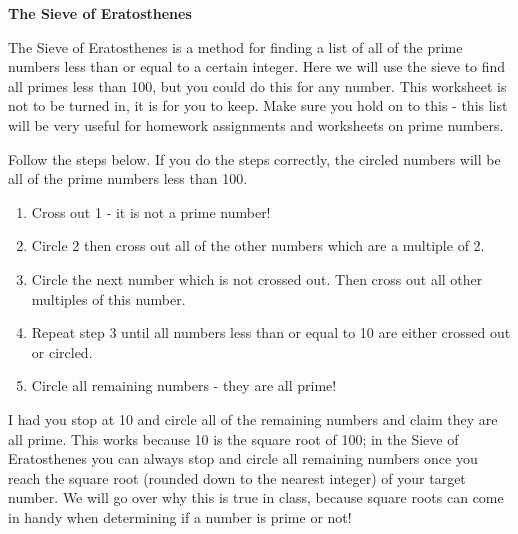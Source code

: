 \documentclass{article}
\begin{document}
\pagestyle{empty}

\begin{center}
\large{\textbf{The Sieve of Eratosthenes}}
\end{center}

\noindent The Sieve of Eratosthenes is a method for finding a list of all of the prime numbers less than or equal to a certain integer. Here we will use the sieve to find all primes less than 100, but you could do this for any number. This worksheet is not to be turned in, it is for you to keep. Make sure you hold on to this - this list will be very useful for homework assignments and worksheets on prime numbers.

\vspace{0.2in}

\noindent Follow the steps below. If you do the steps correctly, the circled numbers will be all of the prime numbers less than 100.
\begin{enumerate}
\item Cross out 1 - it is not a prime number!
\item Circle 2 then cross out all of the other numbers which are a multiple of 2. 
\item Circle the next number which is not crossed out. Then cross out all other multiples of this number.
\item Repeat step 3 until all numbers less than or equal to 10 are either crossed out or circled.
\item Circle all remaining numbers - they are all prime!
\end{enumerate}

\vspace{0.1in}

\noindent I had you stop at 10 and circle all of the remaining numbers and claim they are all prime. This works because 10 is the square root of 100; in the Sieve of Eratosthenes you can always stop and circle all remaining numbers once you reach the square root (rounded down to the nearest integer) of your target number. We will go over why this is true in class, because square roots can come in handy when determining if a number is prime or not! \newline

\vspace{0.2in}
\end{document}

